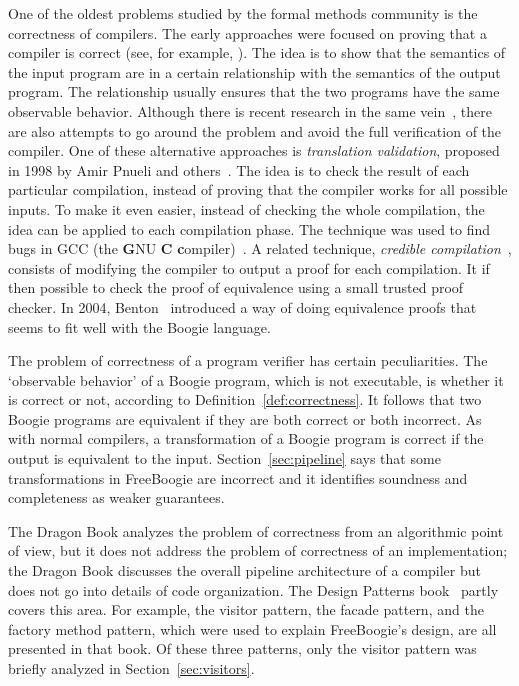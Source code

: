 \documentclass{llncs}
\def\fb#1{{\bf #1}} %
\begin{document}
One of the oldest problems studied by the formal methods
community is the correctness of compilers. The early approaches
were focused on proving that a compiler is correct (see, for
example, \cite{moore1989cc}). The idea is to show that the
semantics of the input program are in a certain relationship
with the semantics of the output program. The relationship
usually ensures that the two programs have the same observable
behavior. Although there is recent research in the same
vein~\cite{leroy2009}, there are also attempts to go around the
problem and avoid the full verification of the compiler. One of
these alternative approaches is \emph{translation validation},
proposed in 1998 by Amir Pnueli and others~\cite{pnueli1998tv}.
The idea is to check the result of each particular compilation,
instead of proving that the compiler works for all possible
inputs. To make it even easier, instead of checking the whole
compilation, the idea can be applied to each compilation phase.
The technique was used to find bugs in GCC (the \fb GNU \fb
C \fb compiler)~\cite{necula2000tv}. A related technique,
\emph{credible compilation}~\cite{rinard1999credible}, consists
of modifying the compiler to output a proof for each compilation.
It if then possible to check the proof of equivalence using a
small trusted proof checker. In 2004, Benton~\cite{benton2004}
introduced a way of doing equivalence proofs that seems to
fit well with the Boogie language.

The problem of correctness of a program verifier has certain
peculiarities. The `observable behavior' of a Boogie program,
which is not executable, is whether it is correct or not,
according to Definition~\ref{def:correctness}. It follows that
two Boogie programs are equivalent if they are both correct or
both incorrect. As with normal compilers, a transformation of
a Boogie program is correct if the output is equivalent to the
input. Section~\ref{sec:pipeline} says that some transformations
in FreeBoogie are incorrect and it identifies soundness and
completeness as weaker guarantees.

The Dragon Book analyzes the problem of correctness from an
algorithmic point of view, but it does not address the problem
of correctness of an implementation; the Dragon Book discusses
the overall pipeline architecture of a compiler but does not
go into details of code organization. The Design Patterns
book~\cite{gamma1995} partly covers this area. For example, the
visitor pattern, the facade pattern, and the factory method
pattern, which were used to explain FreeBoogie's design, are all
presented in that book. Of these three patterns, only the visitor
pattern was briefly analyzed in Section~\ref{sec:visitors}.
\end{document}
